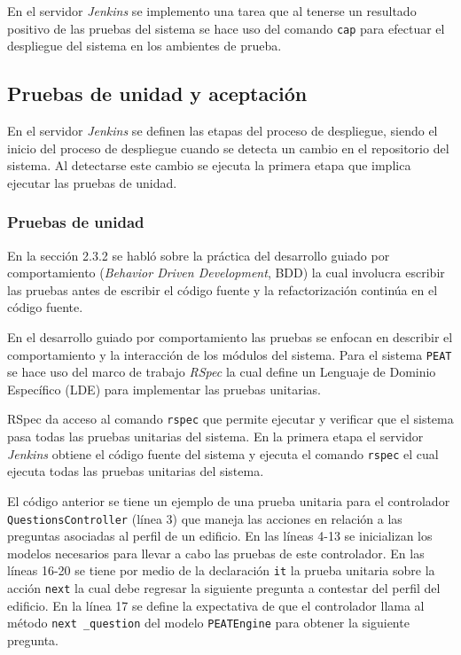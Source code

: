 En el servidor \textit{Jenkins} se implemento una tarea que al tenerse un resultado
positivo de las pruebas del sistema se hace uso del comando \texttt{cap}
para efectuar el despliegue del sistema en los ambientes de prueba.

\subsection{Pruebas de unidad y aceptación}

En el servidor \textit{Jenkins} se definen las etapas del proceso de despliegue,
siendo el inicio del proceso de despliegue cuando se detecta un cambio en el
repositorio del sistema. Al detectarse este cambio se ejecuta la primera etapa
que implica ejecutar las pruebas de unidad.

\subsubsection{Pruebas de unidad}

En la sección 2.3.2 se habló sobre la práctica del desarrollo guiado por
comportamiento (\textit{Behavior Driven Development}, BDD) la cual involucra
escribir las pruebas antes de escribir el código fuente y la refactorización
continúa en el código fuente.

En el desarrollo guiado por comportamiento las pruebas se enfocan en describir el
comportamiento y la interacción de los módulos del sistema. Para el sistema
\texttt{PEAT} se hace uso del marco de trabajo \textit{RSpec} la cual define un
Lenguaje de Dominio Específico (LDE) para implementar las pruebas unitarias.

RSpec da acceso al comando \texttt{rspec} que permite ejecutar y verificar
que el sistema pasa todas las pruebas unitarias del sistema. En la primera
etapa el servidor \textit{Jenkins} obtiene el código fuente del sistema y ejecuta el
comando \texttt{rspec} el cual ejecuta todas las pruebas unitarias del sistema.



El código anterior se tiene un ejemplo de una prueba unitaria para el controlador
\texttt{QuestionsController} (línea 3) que maneja las acciones en relación
a las preguntas asociadas al perfil de un edificio. En las líneas 4-13 se
inicializan los modelos necesarios para llevar a cabo las pruebas de este
controlador.
En las líneas 16-20 se tiene por medio de la declaración \texttt{it} la
prueba unitaria sobre la acción \texttt{next} la cual debe regresar
la siguiente pregunta a contestar del perfil del edificio. En la línea
17 se define la expectativa de que el controlador llama al método \texttt{next
  \_question} del modelo \texttt{PEATEngine} para obtener la siguiente pregunta.

